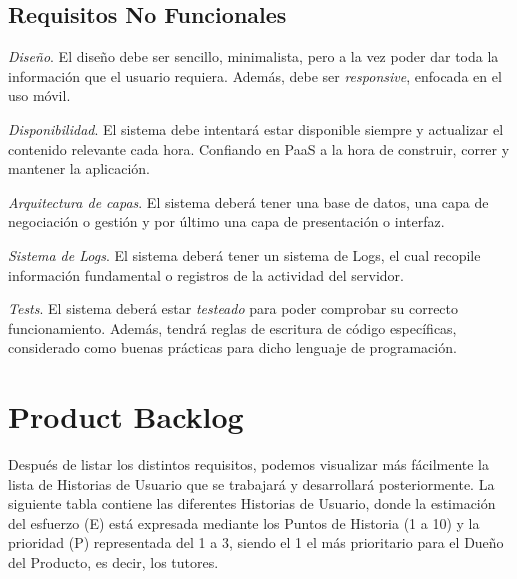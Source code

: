 \subsection{Requisitos No Funcionales}

\begin{enumerate}
    { \renewcommand\labelenumi{R.N. \theenumi}
    \item
    \textit{Diseño}. El diseño debe ser sencillo, minimalista, pero a la vez poder dar toda la información que el usuario requiera. Además, debe ser \textit{responsive}, enfocada en el uso móvil.
    \item
    \textit{Disponibilidad}. El sistema debe intentará estar disponible siempre y actualizar el contenido relevante cada hora. Confiando en \ac{PaaS} a la hora de construir, correr y mantener la aplicación.
    \item
    \textit{Arquitectura de capas}. El sistema deberá tener una base de datos, una capa de negociación o gestión y por último una capa de presentación o interfaz.
    \item
    \textit{Sistema de Logs}. El sistema deberá tener un sistema de Logs, el cual recopile información fundamental o registros de la actividad del servidor.
    \item
    \textit{Tests}. El sistema deberá estar \textit{testeado} para poder comprobar su correcto funcionamiento. Además, tendrá reglas de escritura de código específicas, considerado como buenas prácticas para dicho lenguaje de programación.
}\end{enumerate}

\newpage

\section{Product Backlog}
Después de listar los distintos requisitos, podemos visualizar más fácilmente la lista de Historias de Usuario que se trabajará y desarrollará posteriormente. La siguiente tabla contiene las diferentes Historias de Usuario, donde la estimación del esfuerzo (E) está expresada mediante los Puntos de Historia (1 a 10) y la prioridad (P) representada del 1 a 3, siendo el 1 el más prioritario para el Dueño del Producto, es decir, los tutores.

